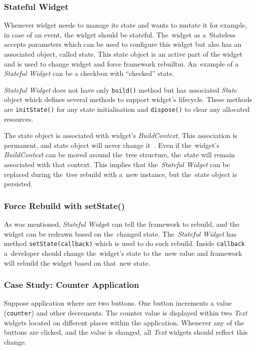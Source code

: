 \subsubsection{Stateful Widget}
Whenever widget needs to manage its state and wants to mutate it for example, in case of an event, the widget should be stateful. The~widget as a~Stateless accepts parameters which can be used to configure this widget but also has an associated object, called state. This state object is an active part of the widget and is used to change widget and force framework rebuilt\gls{ui}. An~example of a \textit{Stateful Widget} can be a checkbox with ``checked'' state. 

\textit{Stateful Widget} does not have only \verb|build()| method but has associated \textit{State} object which defines several methods to support widget's lifecycle. These methods are \verb|initState()| for any state initialisation and \verb|dispose()| to clear any allocated resources. 

The state object is associated with widget's \textit{BuildContext}. This association is permanent, and state object will never change it~\cite{notion-widget-didier}. Even if the~widget's \textit{BuildContext} can be moved around the~tree structure, the~state will remain associated with that context. This implies that the~\textit{Stateful Widget} can be replaced during the~tree rebuild with a~new instance, but the~state object is persisted. 
\subsubsection{Force Rebuild with setState()}
As was mentioned, \textit{Stateful Widge}t can tell the framework to rebuild, and the widget can be redrawn based on the~changed state. The~\textit{Stateful Widget} has method \verb|setState(callback)| which is used to do such rebuild. Inside \verb|callback| a~developer should change the~widget's state to the~new value and framework will rebuild the widget based on that~new state. 
\subsubsection{Case Study: Counter Application}
Suppose application where are two buttons. One button increments a value (\verb|counter|) and other decrements. The counter value is displayed within two \textit{Text} widgets located on different places within the application. Whenever any of the buttons are clicked, and the value is changed, all \textit{Text} widgets should reflect this change.

